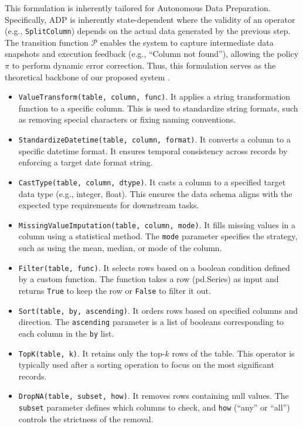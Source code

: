  This formulation is inherently tailored for Autonomous Data Preparation.
Specifically, ADP is inherently {state-dependent} where the validity of an operator (e.g., \texttt{SplitColumn}) depends on the actual data generated by the previous step. The transition function $\mathcal{P}$ enables the system to capture intermediate data snapshots and execution feedback (e.g., ``Column not found''), allowing the policy $\pi$ to perform dynamic error correction.
Thus, this formulation serves as the theoretical backbone of our proposed system \sys.



\iffalse

\begin{itemize}[leftmargin=*]
    \item \texttt{ValueTransform(table, column, func)}. It applies a string transformation function to a specific column. This is used to standardize string formats, such as removing special characters or fixing naming conventions.
    \item \texttt{StandardizeDatetime(table, column, format)}. It converts a column to a specific datetime format. It ensures temporal consistency across records by enforcing a target date format string.
    \item \texttt{CastType(table, column, dtype)}. It casts a column to a specified target data type (e.g., integer, float). This ensures the data schema aligns with the expected type requirements for downstream tasks.
    \item \texttt{MissingValueImputation(table, column, mode)}. It fills missing values in a column using a statistical method. The \texttt{mode} parameter specifies the strategy, such as using the mean, median, or mode of the column.
    \item \texttt{Filter(table, func)}. It selects rows based on a boolean condition defined by a custom function. The function takes a row (pd.Series) as input and returns \texttt{True} to keep the row or \texttt{False} to filter it out.
    \item \texttt{Sort(table, by, ascending)}. It orders rows based on specified columns and direction. The \texttt{ascending} parameter is a list of booleans corresponding to each column in the \texttt{by} list.
    \item \texttt{TopK(table, k)}. It retains only the top-$k$ rows of the table. This operator is typically used after a sorting operation to focus on the most significant records.
    \item \texttt{DropNA(table, subset, how)}. It removes rows containing null values. The \texttt{subset} parameter defines which columns to check, and \texttt{how} (``any'' or ``all'') controls the strictness of the removal.

\end{itemize}

